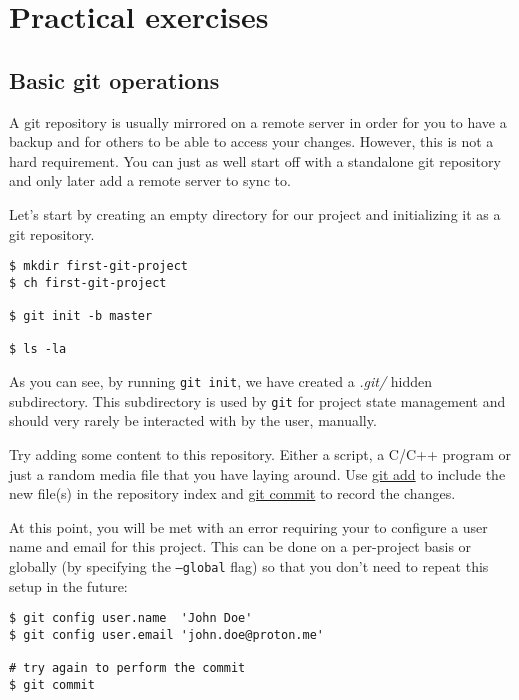 \newpage

\section{Practical exercises}

\subsection{Basic git operations}

A git repository is usually mirrored on a remote server in order for you to
have a backup and for others to be able to access your changes. However, this
is not a hard requirement. You can just as well start off with a standalone
git repository and only later add a remote server to sync to.

Let's start by creating an empty directory for our project and initializing it
as a git repository.

\begin{lstlisting}[style=bashstyle]
$ mkdir first-git-project
$ ch first-git-project

$ git init -b master

$ ls -la
\end{lstlisting}

As you can see, by running \texttt{git init}, we have created a \textit{.git/}
hidden subdirectory. This subdirectory is used by \texttt{git} for project state
management and should very rarely be interacted with by the user, manually.

Try adding some content to this repository. Either a script, a C/C++ program or
just a random media file that you have laying around. Use
\href{https://man.archlinux.org/man/git-add.1}{git add} to include the new
file(s) in the repository index and
\href{https://man.archlinux.org/man/git-commit.1}{git commit} to record the
changes.

At this point, you will be met with an error requiring your to configure a
user name and email for this project. This can be done on a per-project basis
or globally (by specifying the \texttt{--global} flag) so that you don't need
to repeat this setup in the future:

\begin{lstlisting}[style=bashstyle]
$ git config user.name  'John Doe'
$ git config user.email 'john.doe@proton.me'

# try again to perform the commit
$ git commit
\end{lstlisting}

